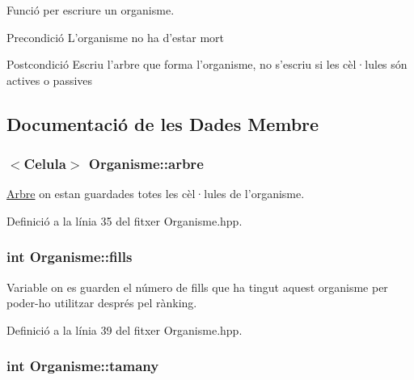 Funció per escriure un organisme. 

\begin{DoxyPrecond}{Precondició}
L'organisme no ha d'estar mort 
\end{DoxyPrecond}
\begin{DoxyPostcond}{Postcondició}
Escriu l'arbre que forma l'organisme, no s'escriu si les cèl·lules són actives o passives 
\end{DoxyPostcond}


\subsection{Documentació de les Dades Membre}
\hypertarget{class_organisme_aa6bc89f1937afd04f86e770c2bde8c69}{
\subsubsection[{arbre}]{$<${\bf Celula}$>$ Organisme\-::arbre\hspace{0.3cm}{\ttfamily [private]}}}\label{class_organisme_aa6bc89f1937afd04f86e770c2bde8c69}


\hyperlink{class_arbre}{Arbre} on estan guardades totes les cèl·lules de l'organisme. 



Definició a la línia 35 del fitxer Organisme.\-hpp.

\hypertarget{class_organisme_a4644da413bb0e38f34566334ebee1c1c}{
\subsubsection[{fills}]{\setlength{\rightskip}{0pt plus 5cm}int Organisme\-::fills\hspace{0.3cm}{\ttfamily [private]}}}\label{class_organisme_a4644da413bb0e38f34566334ebee1c1c}


Variable on es guarden el número de fills que ha tingut aquest organisme per poder-\/ho utilitzar després pel rànking. 



Definició a la línia 39 del fitxer Organisme.\-hpp.

\hypertarget{class_organisme_a5d30992b5ded1a9314aff94ce9fb3932}{
\subsubsection[{tamany}]{\setlength{\rightskip}{0pt plus 5cm}int Organisme\-::tamany\hspace{0.3cm}{\ttfamily [private]}}}\label{class_organisme_a5d30992b5ded1a9314aff94ce9fb3932}


